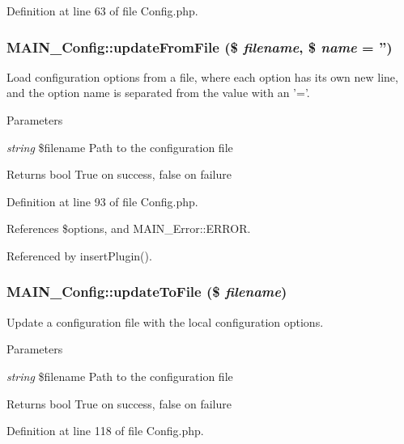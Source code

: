 Definition at line 63 of file Config.php.\hypertarget{classMAIN__Config_a636818348ea40ca509c190c004c89119}{
\subsubsection[{updateFromFile}]{\setlength{\rightskip}{0pt plus 5cm}MAIN\_\-Config::updateFromFile (\$ {\em filename}, \/  \$ {\em name} = {\ttfamily ''})}}
\label{dc/d96/classMAIN__Config_a636818348ea40ca509c190c004c89119}
Load configuration options from a file, where each option has its own new line, and the option name is separated from the value with an '='.


\begin{DoxyParams}{Parameters}
\item[{\em string}]\$filename Path to the configuration file\end{DoxyParams}
\begin{DoxyReturn}{Returns}
bool True on success, false on failure 
\end{DoxyReturn}


Definition at line 93 of file Config.php.

References \$options, and MAIN\_\-Error::ERROR.

Referenced by insertPlugin().\hypertarget{classMAIN__Config_a9316b105c92355638b38a37d61eb0021}{
\subsubsection[{updateToFile}]{\setlength{\rightskip}{0pt plus 5cm}MAIN\_\-Config::updateToFile (\$ {\em filename})}}
\label{dc/d96/classMAIN__Config_a9316b105c92355638b38a37d61eb0021}
Update a configuration file with the local configuration options.


\begin{DoxyParams}{Parameters}
\item[{\em string}]\$filename Path to the configuration file\end{DoxyParams}
\begin{DoxyReturn}{Returns}
bool True on success, false on failure 
\end{DoxyReturn}


Definition at line 118 of file Config.php.

